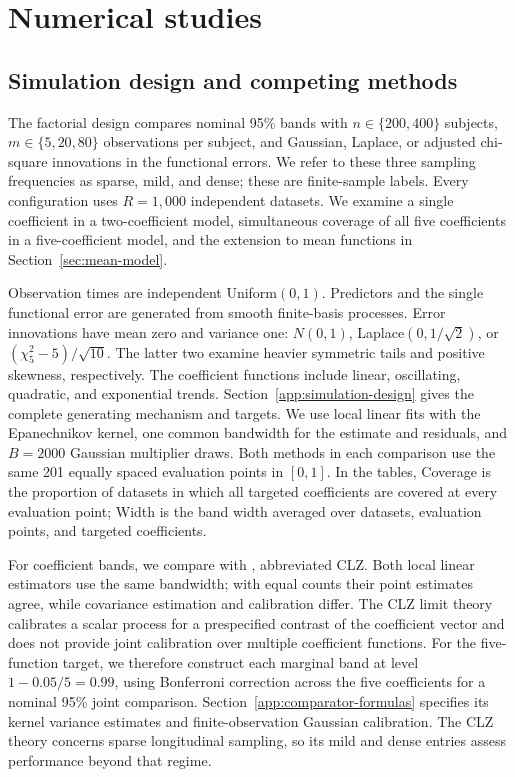 \section{Numerical studies}\label{sec:numerical-study}


\subsection{Simulation design and competing methods}\label{subsec:simulation}

The factorial design compares nominal 95\% bands with $n\in\{200,400\}$ subjects, $m\in\{5,20,80\}$ observations per subject, and Gaussian, Laplace, or adjusted chi-square innovations in the functional errors. We refer to these three sampling frequencies as sparse, mild, and dense; these are finite-sample labels. Every configuration uses $R=1{,}000$ independent datasets. We examine a single coefficient in a two-coefficient model, simultaneous coverage of all five coefficients in a five-coefficient model, and the extension to mean functions in Section~\ref{sec:mean-model}.

Observation times are independent Uniform$(0,1)$. Predictors and the single functional error are generated from smooth finite-basis processes. Error innovations have mean zero and variance one: $N(0,1)$, Laplace$(0,1/\sqrt2)$, or $(\chi^2_5-5)/\sqrt{10}$. The latter two examine heavier symmetric tails and positive skewness, respectively. The coefficient functions include linear, oscillating, quadratic, and exponential trends. Section~\ref{app:simulation-design} gives the complete generating mechanism and targets. We use local linear fits with the Epanechnikov kernel, one common bandwidth for the estimate and residuals, and $B=2000$ Gaussian multiplier draws. Both methods in each comparison use the same 201 equally spaced evaluation points in $[0,1]$. In the tables, Coverage is the proportion of datasets in which all targeted coefficients are covered at every evaluation point; Width is the band width averaged over datasets, evaluation points, and targeted coefficients.

For coefficient bands, we compare with \citet{cao_simultaneous_2018}, abbreviated CLZ. Both local linear estimators use the same bandwidth; with equal counts their point estimates agree, while covariance estimation and calibration differ. The CLZ limit theory calibrates a scalar process for a prespecified contrast of the coefficient vector and does not provide joint calibration over multiple coefficient functions. For the five-function target, we therefore construct each marginal band at level $1-0.05/5=0.99$, using Bonferroni correction across the five coefficients for a nominal 95\% joint comparison. Section~\ref{app:comparator-formulas} specifies its kernel variance estimates and finite-observation Gaussian calibration. The CLZ theory concerns sparse longitudinal sampling, so its mild and dense entries assess performance beyond that regime.

